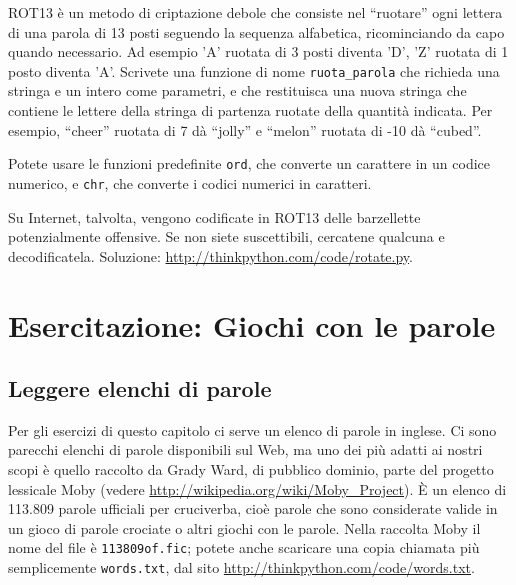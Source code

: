 \documentclass[10pt]{book}
\begin{document}
\vspace{0.2in}
\begin{exercise}

\label{exrotate}
ROT13 è un metodo di criptazione debole che consiste nel ``ruotare'' ogni lettera di una parola di 13 posti seguendo la sequenza alfabetica, ricominciando da capo quando necessario. Ad esempio 'A' ruotata di 3 posti diventa 'D', 'Z' ruotata di 1 posto diventa 'A'.
Scrivete una funzione di nome \verb"ruota_parola" che richieda una stringa e un intero come parametri, e che restituisca una nuova stringa che contiene le lettere della stringa di partenza ruotate della quantità indicata.
Per esempio, ``cheer'' ruotata di 7 dà ``jolly'' e ``melon'' ruotata di -10
dà ``cubed''.  


Potete usare le funzioni predefinite {\tt ord}, che converte un carattere in un codice numerico, e {\tt chr}, che converte i codici numerici in caratteri.

Su Internet, talvolta, vengono codificate in ROT13 delle barzellette potenzialmente offensive. Se non siete suscettibili, cercatene qualcuna e decodificatela. Soluzione: \url{http://thinkpython.com/code/rotate.py}.

\end{exercise}


\chapter{Esercitazione: Giochi con le parole}

\section{Leggere elenchi di parole}
\label{wordlist}

Per gli esercizi di questo capitolo ci serve un elenco di parole in inglese. Ci sono parecchi elenchi di parole disponibili sul Web, ma uno dei più adatti ai nostri scopi è quello raccolto da Grady Ward, di pubblico dominio, parte del progetto lessicale Moby (vedere \url{http://wikipedia.org/wiki/Moby_Project}). È un elenco di 113.809 parole ufficiali per cruciverba, cioè parole che sono considerate valide in un gioco di parole crociate o altri giochi con le parole. Nella raccolta Moby il nome del file è {\tt 113809of.fic}; potete anche scaricare una copia chiamata più semplicemente {\tt words.txt}, dal sito
\url{http://thinkpython.com/code/words.txt}.
\end{document}
